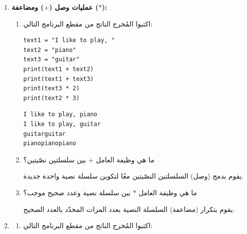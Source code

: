 \documentclass[14pt]{extarticle}
\begin{document}
\begin{enumerate}[resume, label=\textbf{تمرين \arabic*:}, wide=0pt, itemsep=2.2em]

\item \textbf{عمليات وصل ($+$) ومضاعفة ($*$):}
\begin{enumerate}[label=\alph*.]
\item اكتبوا المُخرج الناتج من مقطع البرنامج التالي:

\begin{boxCode}
\begin{english}
\begin{verbatim}
text1 = "I like to play, "
text2 = "piano"
text3 = "guitar"
print(text1 + text2)
print(text1 + text3)
print(text3 * 2)
print(text2 * 3)
\end{verbatim}
\end{english}
\end{boxCode}

\ifwithsols
\begin{boxSolution}
\begin{english}
\begin{verbatim}
I like to play, piano
I like to play, guitar
guitarguitar
pianopianopiano
\end{verbatim}
\end{english}
\end{boxSolution}
\fi
\filbreak

\item ما هي وظيفة العامل $+$ بين سلسلتين نصّيتين؟
\ifwithsols
\begin{boxSolution}
يقوم بدمج (وصل) السلسلتين النصّيتين معًا لتكوين سلسلة نصية واحدة جديدة.
\end{boxSolution}
\fi
\filbreak

\item ما هي وظيفة العامل $*$ بين سلسلة نصية وعدد صحيح موجب؟
\ifwithsols
\begin{boxSolution}
يقوم بتكرار (مضاعفة) السلسلة النصية بعدد المرات المحدّد بالعدد الصحيح.
\end{boxSolution}
\fi
\filbreak
\end{enumerate}
\filbreak

\item
\begin{enumerate}[label=\alph*.]
\item اكتبوا المُخرج الناتج من مقطع البرنامج التالي:


\end{enumerate}
\end{enumerate}
\end{document}
